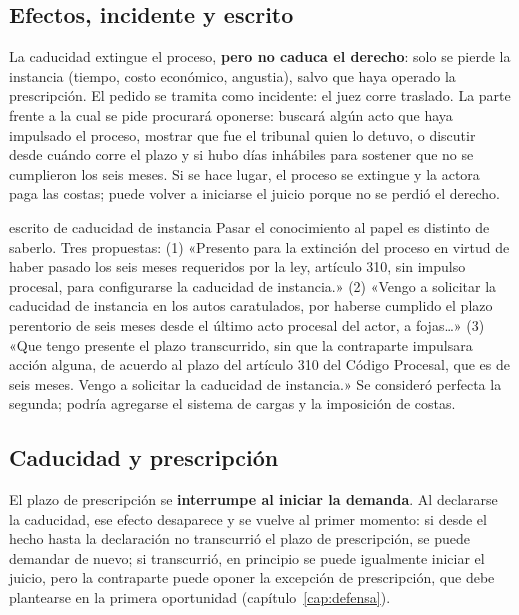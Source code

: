 \documentclass[12pt,oneside]{book}
\begin{document}
\subsection{Efectos, incidente y escrito}

La caducidad extingue el proceso, \textbf{pero no caduca el derecho}: solo se pierde la instancia (tiempo, costo económico, angustia), salvo que haya operado la prescripción. El pedido se tramita como incidente: el juez corre traslado. La parte frente a la cual se pide procurará oponerse: buscará algún acto que haya impulsado el proceso, mostrar que fue el tribunal quien lo detuvo, o discutir desde cuándo corre el plazo y si hubo días inhábiles para sostener que no se cumplieron los seis meses.
Si se hace lugar, el proceso se extingue y la actora paga las costas; puede volver a iniciarse el juicio porque no se perdió el derecho.

\begin{ejercicio}{escrito de caducidad de instancia}
Pasar el conocimiento al papel es distinto de saberlo. Tres propuestas: (1) «Presento para la extinción del proceso en virtud de haber pasado los seis meses requeridos por la ley, artículo 310, sin impulso procesal, para configurarse la caducidad de instancia.» (2) «Vengo a solicitar la caducidad de instancia en los autos caratulados, por haberse cumplido el plazo perentorio de seis meses desde el último acto procesal del actor, a fojas\ldots» (3) «Que tengo presente el plazo transcurrido, sin que la contraparte impulsara acción alguna, de acuerdo al plazo del artículo 310 del Código Procesal, que es de seis meses. Vengo a solicitar la caducidad de instancia.» Se consideró perfecta la segunda; podría agregarse el sistema de cargas y la imposición de costas.
\end{ejercicio}

\subsection{Caducidad y prescripción}\label{sec:caducidad-prescripcion}

El plazo de prescripción se \textbf{interrumpe al iniciar la demanda}. Al declararse la caducidad, ese efecto desaparece y se vuelve al primer momento: si desde el hecho hasta la declaración no transcurrió el plazo de prescripción, se puede demandar de nuevo; si transcurrió, en principio se puede igualmente iniciar el juicio, pero la contraparte puede oponer la excepción de prescripción, que debe plantearse en la primera oportunidad (capítulo~\ref{cap:defensa}).
\end{document}
